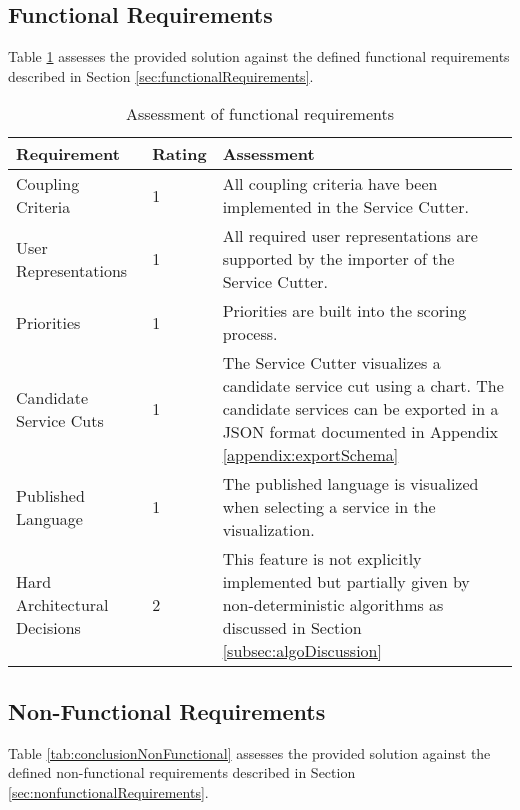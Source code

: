 \subsection{Functional Requirements}

Table \ref{tab:conclusionFunctional} assesses the provided solution against the defined functional requirements described in Section \ref{sec:functionalRequirements}.

\begin{table}[H]
	\centering
	\caption{Assessment of functional requirements}
	\label{tab:conclusionFunctional}
	\begin{tabular}{|p{100pt}|l|p{250pt}|}
	\hline \textbf{Requirement} & \textbf{Rating} & \textbf{Assessment} \\ 
	\hline Coupling Criteria & 1 & All coupling criteria have been implemented in the Service Cutter.  \\ 
	\hline User Representations & 1 & All required user representations are supported by the importer of the Service Cutter. \\ 
	\hline Priorities & 1 & Priorities are built into the scoring process. \\ 
	\hline Candidate Service Cuts & 1 & The Service Cutter visualizes a candidate service cut using a chart. The candidate services can be exported in a \gls{JSON} format documented in Appendix \ref{appendix:exportSchema} \\ 
	\hline Published Language & 1 & The published language is visualized when selecting a service in the visualization.  \\ 
	\hline Hard Architectural Decisions & 2 & This feature is not explicitly implemented but partially given by non-deterministic algorithms as discussed in Section \ref{subsec:algoDiscussion}\\
	\hline 
	\end{tabular} 
\end{table}

\clearpage
\subsection{Non-Functional Requirements}

Table \ref{tab:conclusionNonFunctional} assesses the provided solution against the defined non-functional requirements described in Section \ref{sec:nonfunctionalRequirements}. 

